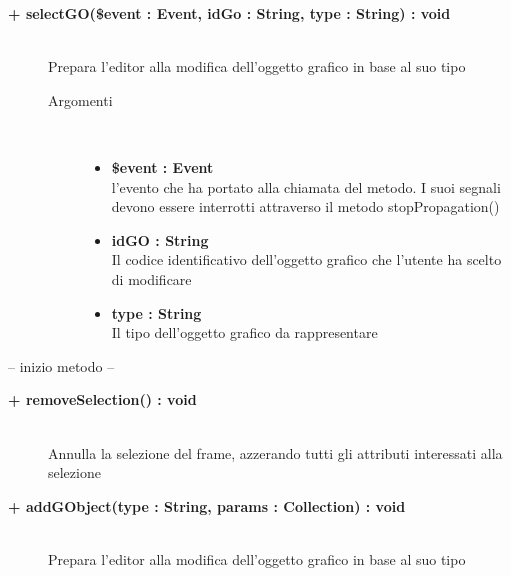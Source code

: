\begin{description}
\begin{description}
	\end{description}
	
	\begin{description}
		\item[\textbf{\color{blue}+ selectGO(\$event : Event, idGo : String, type : String) : void 	}] \hfill \\
			Prepara l'editor alla modifica dell'oggetto grafico in base al suo tipo
			
		\begin{description}
			\item[Argomenti] \hfill \\
				\begin{itemize}
				
					\item \textbf{\$event : Event	} \hfill \\
					l'evento che ha portato alla chiamata del metodo. I suoi segnali devono essere interrotti attraverso il metodo stopPropagation()		
					\item \textbf{idGO : String	} \hfill \\
					Il codice identificativo dell'oggetto grafico che l'utente ha scelto di modificare
					\item \textbf{type : String	} \hfill \\
					Il tipo dell'oggetto grafico da rappresentare
				\end{itemize}
				
		\end{description}
	\end{description}
	
	 -- inizio metodo -- %
	\begin{description}
		\item[\textbf{\color{blue}+ removeSelection() : void	}] \hfill \\
			Annulla la selezione del frame, azzerando tutti gli attributi interessati alla selezione
		
	\end{description}
	
	
	\begin{description}
		\item[\textbf{\color{blue}+ addGObject(type : String, params : Collection) : void 	}] \hfill \\
			Prepara l'editor alla modifica dell'oggetto grafico in base al suo tipo
			

\end{description}
\end{description}
